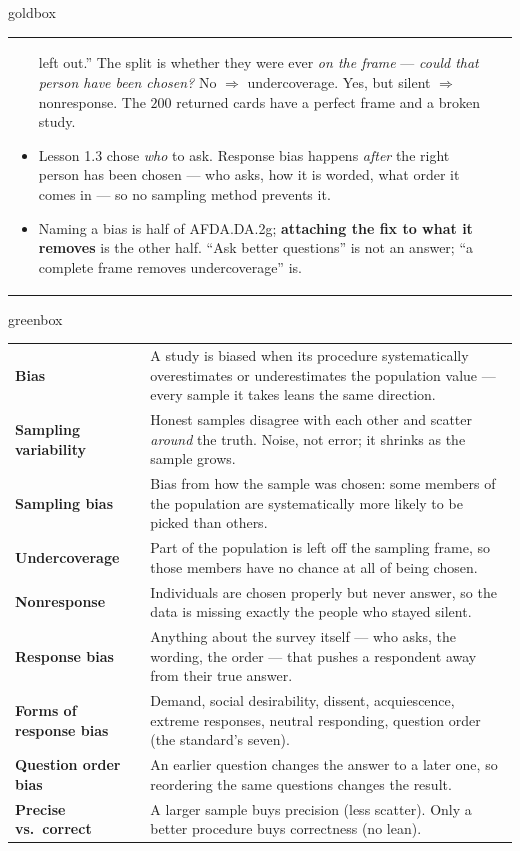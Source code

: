 \documentclass[10pt]{article}
\begin{document}
\begin{skillbox}{goldbox}
\begin{tabularx}{\linewidth}{@{}X|X@{}}
\begin{itemize}[leftmargin=1.1em, nosep, after=\vspace{2pt}]
        left out.'' The split is whether they were ever \emph{on the frame} --- \emph{could that
        person have been chosen?} No $\Rightarrow$ undercoverage. Yes, but silent
        $\Rightarrow$ nonresponse. The $200$ returned cards have a perfect frame and a broken
        study.
  \item Lesson 1.3 chose \emph{who} to ask. Response bias happens \emph{after} the right
        person has been chosen --- who asks, how it is worded, what order it comes in --- so no
        sampling method prevents it.
  \item Naming a bias is half of AFDA.DA.2g; \textbf{attaching the fix to what it removes} is
        the other half. ``Ask better questions'' is not an answer; ``a complete frame removes
        undercoverage'' is.
\end{itemize}
\end{tabularx}
\end{skillbox}

\boxguard[24]
\begin{skillbox}{greenbox}
\small
\renewcommand{\arraystretch}{1.35}
\begin{tabularx}{\linewidth}{@{} >{\bfseries}p{3.1cm} X @{}}
Bias & A study is biased when its procedure systematically overestimates or underestimates
       the population value --- every sample it takes leans the same direction. \\
Sampling variability & Honest samples disagree with each other and scatter \emph{around} the
       truth. Noise, not error; it shrinks as the sample grows. \\
Sampling bias & Bias from how the sample was chosen: some members of the population are
       systematically more likely to be picked than others. \\
Undercoverage & Part of the population is left off the sampling frame, so those members
       have no chance at all of being chosen. \\
Nonresponse & Individuals are chosen properly but never answer, so the data is missing
       exactly the people who stayed silent. \\
Response bias & Anything about the survey itself --- who asks, the wording, the order --- that
       pushes a respondent away from their true answer. \\
Forms of response bias & Demand, social desirability, dissent, acquiescence, extreme
       responses, neutral responding, question order (the standard's seven). \\
Question order bias & An earlier question changes the answer to a later one, so reordering the
       same questions changes the result. \\
Precise vs.\ correct & A larger sample buys precision (less scatter). Only a better procedure
       buys correctness (no lean). \\
\end{tabularx}
\end{skillbox}
\end{document}
